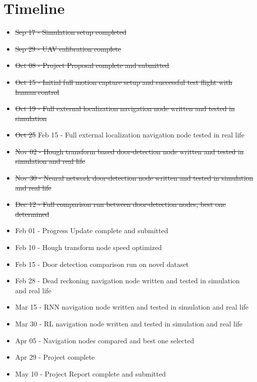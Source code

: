 \documentclass[12pt]{article}
\begin{document}
\section{Timeline}
\begin{itemize}
    \item \sout{Sep 17 - Simulation setup completed}
    \item \sout{Sep 29 - UAV calibration complete}
    \item \sout{Oct 08 - Project Proposal complete and submitted}
    \item \sout{Oct 15 - Initial full motion capture setup and successful test flight with human control}
    \item \sout{Oct 19 - Full external localization navigation node written and tested in simulation}
    \item \sout{Oct 25} Feb 15 - Full external localization navigation node tested in real life
    \item \sout{Nov 02 - Hough transform based door-detection node written and tested in simulation and real life}
    \item \sout{Nov 30 - Neural network door-detection node written and tested in simulation and real life}
    \item \sout{Dec 12 - Full comparison run between door-detection nodes, best one determined}
	\item Feb 01 - Progress Update complete and submitted
    \item Feb 10 - Hough transform node speed optimized
    \item Feb 15 - Door detection comparison run on novel dataset
    \item Feb 28 - Dead reckoning navigation node written and tested in simulation and real life
	\item Mar 15 - RNN navigation node written and tested in simulation and real life
	\item Mar 30 - RL navigation node written and tested in simulation and real life
	\item Apr 05 - Navigation nodes compared and best one selected
	\item Apr 29 - Project complete
	\item May 10 - Project Report complete and submitted
\end{itemize}

\end{document}
